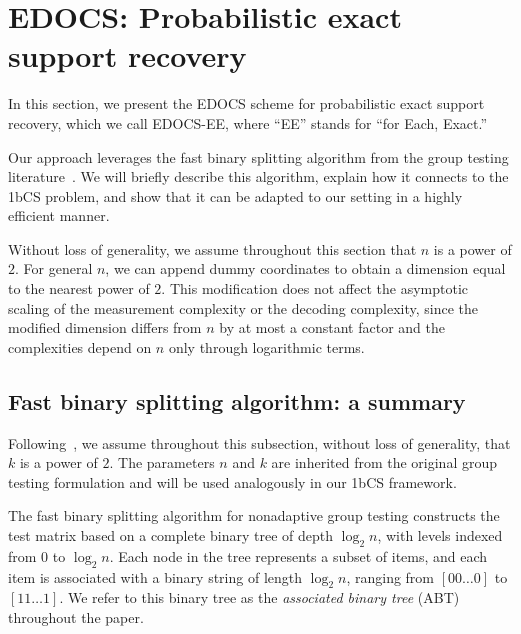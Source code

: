 \documentclass{article}
\begin{document}

\section{EDOCS: Probabilistic exact support recovery}\label{sec:RSR}
In this section, we present the EDOCS scheme for probabilistic exact support recovery, which we call EDOCS-EE, where ``EE'' stands for ``for Each, Exact.''  

Our approach leverages the fast binary splitting algorithm from the group testing literature~\cite{price2020fast,cheraghchi2020combinatorial,wang2023quickly,price2023fast,li2025noisy}. We will briefly describe this algorithm, explain how it connects to the 1bCS problem, and show that it can be adapted to our setting in a highly efficient manner. 

Without loss of generality, we assume throughout this section that $n$ is a power of $2$. For general $n$, we can append dummy coordinates to obtain a dimension equal to the nearest power of $2$. This modification does not affect the asymptotic scaling of the measurement complexity or the decoding complexity, since the modified dimension differs from $n$ by at most a constant factor and the complexities depend on $n$ only through logarithmic terms.

\subsection{Fast binary splitting algorithm: a summary}\label{sec:fbs}

Following~\cite[Section~III]{wang2023quickly}, we assume throughout this subsection, without loss of generality, that $k$ is a power of $2$. The parameters $n$ and $k$ are inherited from the original group testing formulation and will be used analogously in our 1bCS framework.

The fast binary splitting algorithm for nonadaptive group testing constructs the test matrix based on a complete binary tree of depth $\log_2 n$, with levels indexed from $0$ to $\log_2 n$. Each node in the tree represents a subset of items, and each item is associated with a binary string of length $\log_2 n$, ranging from $[00\ldots0]$ to $[11\ldots1]$. We refer to this binary tree as the \emph{associated binary tree} (ABT) throughout the paper.
\end{document}
